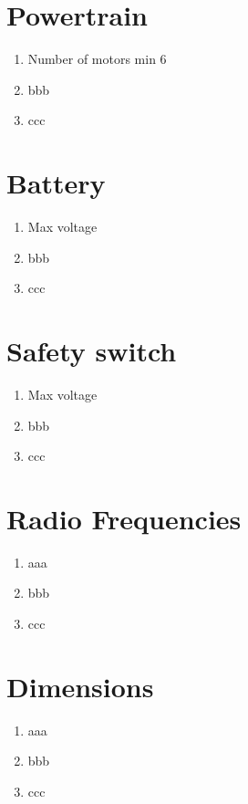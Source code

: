 


\section{Powertrain}
\begin{enumerate}
    \item Number of motors min 6
    \item bbb
    \item ccc
  \end{enumerate}

  \section{Battery}
  \begin{enumerate}
      \item Max voltage
      \item bbb
      \item ccc
    \end{enumerate}

    \section{Safety switch}
  \begin{enumerate}
      \item Max voltage
      \item bbb
      \item ccc
    \end{enumerate}


\section{Radio Frequencies}
    \begin{enumerate}
        \item aaa
        \item bbb
        \item ccc
      \end{enumerate}
  

\section{Dimensions}

\begin{enumerate}
  \item aaa
  \item bbb
  \item ccc
\end{enumerate}




